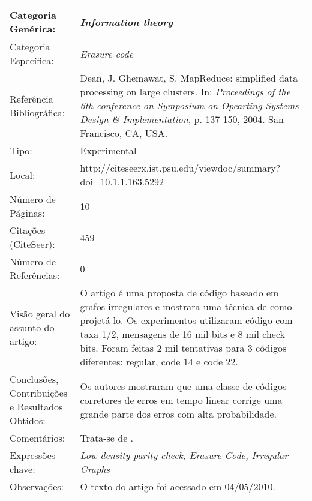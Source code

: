 \documentclass[10pt,a4paper]{article}
\begin{document}
\begin{center}
\begin{tabular}{|p{5cm}||p{10cm}|}
\hline

Categoria Genérica: & \emph{Information theory}\\\hline
Categoria Específica: & \emph{Erasure code}\\\hline
Referência Bibliográfica: & Dean, J. Ghemawat, S. MapReduce: simplified data processing on large clusters. In:  \emph{Proceedings of the 6th conference on Symposium on Opearting Systems Design \& Implementation}, p. 137-150, 2004. San Francisco, CA, USA. \\\hline
Tipo: & Experimental\\\hline
Local: & http://citeseerx.ist.psu.edu/viewdoc/summary?doi=10.1.1.163.5292\\\hline
Número de Páginas: & 10\\\hline
Citações (CiteSeer): & 459\\\hline
Número de Referências: & 0\\\hline
Visão geral do assunto do artigo: & O artigo é uma proposta de código baseado em grafos irregulares e mostrara uma técnica de como projetá-lo. Os experimentos utilizaram código com taxa 1/2, mensagens de 16 mil bits e 8 mil check bits. Foram feitas 2 mil tentativas para 3 códigos diferentes: regular, code 14 e code 22. \\\hline
Conclusões, Contribuições e Resultados Obtidos: &  Os autores mostraram que uma classe de códigos corretores de erros em tempo linear corrige uma grande parte dos erros com alta probabilidade. \\\hline
Comentários: & Trata-se de . \\\hline
Expressões-chave: & \emph{Low-density parity-check, Erasure Code, Irregular Graphs}\\\hline
Observações: &  O texto do artigo foi acessado em 04/05/2010.\\\hline

\end{tabular}
\end{center}
\end{document}
